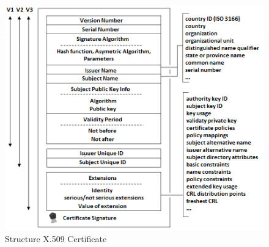 \documentclass[
  digital, %
  notable,   %
  lof,     %
  lot,     %
]{fithesis3}
\begin{document}

\begin{figure}[th]
	\centering
	\includegraphics[width=1.05\textwidth]{certificate}
	\caption{Structure X.509 Certificate}
	\label{fig:certificate}
\end{figure}
\end{document}
